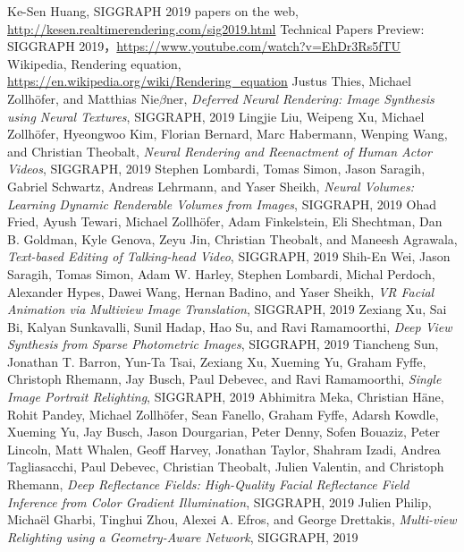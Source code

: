 \documentclass[logo,reportComp]{thesis}
\begin{document}
\begin{thebibliography}{99}
 Ke-Sen Huang, SIGGRAPH 2019 papers on the web, \url{http://kesen.realtimerendering.com/sig2019.html}
 Technical Papers Preview: SIGGRAPH 2019，\url{https://www.youtube.com/watch?v=EhDr3Rs5fTU}
 Wikipedia, Rendering equation, \url{https://en.wikipedia.org/wiki/Rendering_equation}
 Justus Thies, Michael Zollh\"ofer, and Matthias Nie$\beta$ner, \emph{Deferred Neural Rendering: Image Synthesis using Neural Textures}, SIGGRAPH, 2019
 Lingjie Liu, Weipeng Xu, Michael Zollh\"ofer, Hyeongwoo Kim, Florian Bernard, Marc Habermann, Wenping Wang, and Christian Theobalt, \emph{Neural Rendering and Reenactment of Human Actor Videos}, SIGGRAPH, 2019
 Stephen Lombardi, Tomas Simon, Jason Saragih, Gabriel Schwartz, Andreas Lehrmann, and Yaser Sheikh, \emph{Neural Volumes: Learning Dynamic Renderable Volumes from Images}, SIGGRAPH, 2019
 Ohad Fried, Ayush Tewari, Michael Zollh\"ofer, Adam Finkelstein, Eli Shechtman, Dan B. Goldman, Kyle Genova, Zeyu Jin, Christian Theobalt, and Maneesh Agrawala, \emph{Text-based Editing of Talking-head Video}, SIGGRAPH, 2019
 Shih-En Wei, Jason Saragih, Tomas Simon, Adam W. Harley, Stephen Lombardi, Michal Perdoch, Alexander Hypes, Dawei Wang, Hernan Badino, and Yaser Sheikh, \emph{VR Facial Animation via Multiview Image Translation}, SIGGRAPH, 2019
 Zexiang Xu, Sai Bi, Kalyan Sunkavalli, Sunil Hadap, Hao Su, and Ravi Ramamoorthi, \emph{Deep View Synthesis from Sparse Photometric Images}, SIGGRAPH, 2019
 Tiancheng Sun, Jonathan T. Barron, Yun-Ta Tsai, Zexiang Xu, Xueming Yu, Graham Fyffe, Christoph Rhemann, Jay Busch, Paul Debevec, and Ravi Ramamoorthi, \emph{Single Image Portrait Relighting}, SIGGRAPH, 2019
 Abhimitra Meka, Christian Häne, Rohit Pandey, Michael Zollh\"ofer, Sean Fanello, Graham Fyffe, Adarsh Kowdle, Xueming Yu, Jay Busch, Jason Dourgarian, Peter Denny, Sofen Bouaziz, Peter Lincoln, Matt Whalen, Geoff Harvey, Jonathan Taylor, Shahram Izadi, Andrea Tagliasacchi, Paul Debevec, Christian Theobalt, Julien Valentin, and Christoph Rhemann, \emph{Deep Reflectance Fields: High-Quality Facial Reﬂectance Field Inference from
Color Gradient Illumination}, SIGGRAPH, 2019
 Julien Philip, Micha\"el Gharbi, Tinghui Zhou, Alexei A. Efros, and George Drettakis, \emph{Multi-view Relighting using a Geometry-Aware Network}, SIGGRAPH, 2019

\end{thebibliography}
\end{document}
